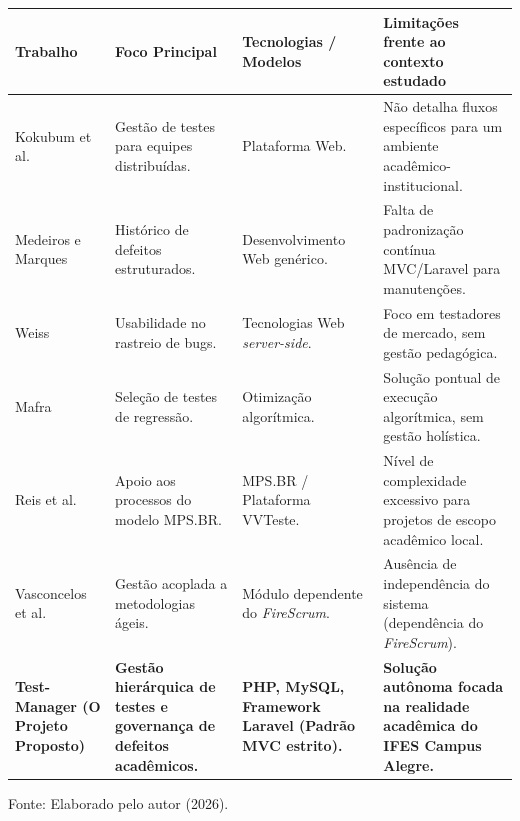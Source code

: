 \begin{quadro}[htbp]
\centering
\caption{Quadro comparativo entre trabalhos correlatos e o sistema proposto.}
\label{tab:trabalhos_correlatos}
\vspace{0.2cm}
\footnotesize
\begin{tabular}{|p{3cm}|p{3.5cm}|p{3.5cm}|p{4cm}|}
\hline
\textbf{Trabalho} & \textbf{Foco Principal} & \textbf{Tecnologias / Modelos} & \textbf{Limitações frente ao contexto estudado} \\ \hline
Kokubum et al. \cite{kokubum2025} & Gestão de testes para equipes distribuídas. & Plataforma Web. & Não detalha fluxos específicos para um ambiente acadêmico-institucional. \\ \hline
Medeiros e Marques \cite{medeiros2022} & Histórico de defeitos estruturados. & Desenvolvimento Web genérico. & Falta de padronização contínua MVC/Laravel para manutenções. \\ \hline
Weiss \cite{weiss2013} & Usabilidade no rastreio de bugs. & Tecnologias Web \textit{server-side}. & Foco em testadores de mercado, sem gestão pedagógica. \\ \hline
Mafra \cite{mafra2010} & Seleção de testes de regressão. & Otimização algorítmica. & Solução pontual de execução algorítmica, sem gestão holística. \\ \hline
Reis et al. \cite{reis2012} & Apoio aos processos do modelo MPS.BR. & MPS.BR / Plataforma VVTeste. & Nível de complexidade excessivo para projetos de escopo acadêmico local. \\ \hline
Vasconcelos et al. \cite{vasconcelos2013} & Gestão acoplada a metodologias ágeis. & Módulo dependente do \textit{FireScrum}. & Ausência de independência do sistema (dependência do \textit{FireScrum}). \\ \hline
\textbf{Test-Manager (O Projeto Proposto)} & \textbf{Gestão hierárquica de testes e governança de defeitos acadêmicos.} & \textbf{PHP, MySQL, Framework Laravel (Padrão MVC estrito).} & \textbf{Solução autônoma focada na realidade acadêmica do IFES Campus Alegre.} \\ \hline
\end{tabular}

\vspace{0.2cm}
{\raggedright \small Fonte: Elaborado pelo autor (2026).\par}
\end{quadro}
